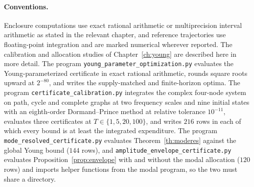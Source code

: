 \documentclass[11pt,notitlepage]{report}
\theoremstyle{definition}
\theoremstyle{remark}
\begin{document}
\paragraph{Conventions.} Enclosure computations use exact rational arithmetic or multiprecision interval arithmetic as stated in the relevant chapter, and reference trajectories use floating-point integration and are marked numerical wherever reported. The calibration and allocation studies of Chapter~\ref{ch:young} are described here in more detail. The program \texttt{young\_parameter\_optimization.py} evaluates the Young-parameterized certificate in exact rational arithmetic, rounds square roots upward at $2^{-80}$, and writes the supply-matched and finite-horizon optima. The program \texttt{certificate\_calibration.py} integrates the complex four-node system on path, cycle and complete graphs at two frequency scales and nine initial states with an eighth-order Dormand--Prince method at relative tolerance $10^{-11}$, evaluates three certificates at $T\in\{1,5,20,100\}$, and writes $216$ rows in each of which every bound is at least the integrated expenditure. The program \texttt{mode\_resolved\_certificate.py} evaluates Theorem~\ref{th:moderes} against the global Young bound ($144$ rows), and \texttt{amplitude\_envelope\_certificate.py} evaluates Proposition~\ref{prop:envelope} with and without the modal allocation ($120$ rows) and imports helper functions from the modal program, so the two must share a directory.
\end{document}
